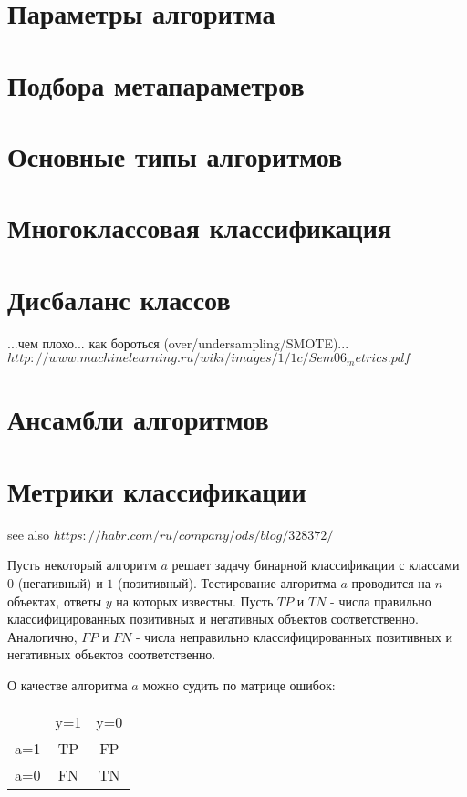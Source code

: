 \section{Параметры алгоритма}


\section{Подбора метапараметров}


\section{Основные типы алгоритмов}


\section{Многоклассовая классификация}


\section{Дисбаланс классов}

...чем плохо... как бороться (over/undersampling/SMOTE)...
$http://www.machinelearning.ru/wiki/images/1/1c/Sem06_metrics.pdf$

\section{Ансамбли алгоритмов}


\section{Метрики классификации}

see also
$https://habr.com/ru/company/ods/blog/328372/$

Пусть некоторый алгоритм $a$ решает задачу бинарной классификации с классами $0$ (негативный) и $1$ (позитивный).
Тестирование алгоритма $a$ проводится на $n$ объектах, ответы $y$ на которых известны. Пусть $TP$ и $TN$ - числа правильно классифицированных позитивных и негативных объектов соответственно. Аналогично, $FP$ и $FN$ - числа неправильно классифицированных позитивных и негативных объектов соответственно.

О качестве алгоритма $a$ можно судить по матрице ошибок:
\begin{center}
\begin{tabular}{ c c c }
     & y=1 & y=0 \\ 
 a=1 & TP  & FP \\  
 a=0 & FN  & TN    
\end{tabular}
\end{center}

